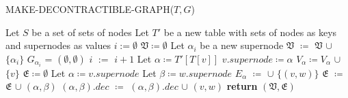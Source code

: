 \begin{algorithm}[H]
    \caption{MAKE-DECONTRACTIBLE-GRAPH($T,G$)}
    \begin{algorithmic}[1]
        \State Let $S$ be a set of sets of nodes
        \State Let $T\mathcal{'}$ be a new table with sets of nodes as keys and supernodes as values
        \State $i:=\emptyset$
        \State $\mathfrak{V} \coloneqq \emptyset$
                \State Let $\alpha_i$ be a new supernode
                \State $\mathfrak{V}$ $\coloneqq$ $\mathfrak{V}$ $\cup$ $\{\alpha_i\}$
                \State $G_{\alpha_i}$ = $(\emptyset, \emptyset)$
                \State $i$ $:=$ $i+1$
            \EndIf
            \State Let $\alpha \coloneqq T\mathcal{'}[T[v]]$
            \State $v.supernode \coloneqq \alpha$
            \State $V_{\alpha} \coloneqq V_{\alpha}$ $\cup$ $\{v\}$
        \EndFor
        \State $\mathfrak{E} \coloneqq \emptyset$
            \State Let $\alpha \coloneqq v.supernode$
            \State Let $\beta \coloneqq w.supernode$
            \If {$(\alpha == \beta )$}
                \State $E_{\alpha}$ $\coloneqq$ $\cup$ $\{(v,w)\}$
            \Else
                    \State $\mathfrak{E}$ $\coloneqq$ $\mathfrak{E}$ $\cup$ $(\alpha , \beta)$
                \EndIf
                \State $(\alpha , \beta).dec$ $\coloneqq$ $(\alpha , \beta).dec$ $\cup$ $(v, w)$
            \EndIf
        \EndFor
        \State \textbf{return} $(\mathfrak{V}, \mathfrak{E})$
    \end{algorithmic}\label{alg:make-decontractible-graph}
\end{algorithm}